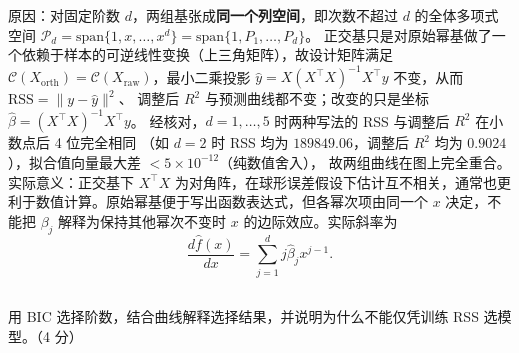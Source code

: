 \documentclass[12pt,a4paper]{article}
\begin{document}
\begin{answerbox}
原因：对固定阶数 $d$，两组基张成\textbf{同一个列空间}，即次数不超过 $d$ 的全体多项式空间
$\mathcal{P}_d=\mathrm{span}\{1,x,\dots,x^d\}=\mathrm{span}\{1,P_1,\dots,P_d\}$。
正交基只是对原始幂基做了一个依赖于样本的可逆线性变换（上三角矩阵），故设计矩阵满足
$\mathcal{C}(X_{\mathrm{orth}})=\mathcal{C}(X_{\mathrm{raw}})$，最小二乘投影
$\hat{y}=X(X^{\top}X)^{-1}X^{\top}y$ 不变，从而 $\mathrm{RSS}=\lVert y-\hat{y}\rVert^2$、
调整后 $R^2$ 与预测曲线都不变；改变的只是坐标 $\hat{\beta}=(X^{\top}X)^{-1}X^{\top}y$。
经核对，$d=1,\dots,5$ 时两种写法的 RSS 与调整后 $R^2$ 在小数点后 4 位完全相同
（如 $d=2$ 时 RSS 均为 $189849.06$，调整后 $R^2$ 均为 $0.9024$），拟合值向量最大差 $<5\times 10^{-12}$（纯数值舍入），
故两组曲线在图上完全重合。实际意义：正交基下 $X^{\top}X$ 为对角阵，在球形误差假设下估计互不相关，通常也更利于数值计算。原始幂基便于写出函数表达式，但各幂次项由同一个 $x$ 决定，不能把 $\beta_j$ 解释为保持其他幂次不变时 $x$ 的边际效应。实际斜率为
$$
\frac{d\hat f(x)}{dx}=\sum_{j=1}^{d}j\hat\beta_jx^{j-1}.
$$

\end{answerbox}

\subsection{}

用 BIC 选择阶数，结合曲线解释选择结果，并说明为什么不能仅凭训练 RSS 选模型。（4 分）
\end{document}
